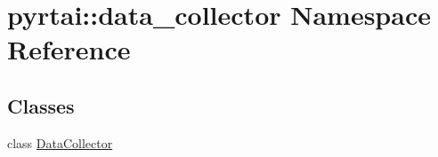 \hypertarget{namespacepyrtai_1_1data__collector}{
\section{pyrtai\-:\-:data\-\_\-collector \-Namespace \-Reference}
\label{namespacepyrtai_1_1data__collector}
}
\subsection*{\-Classes}
\begin{DoxyCompactItemize}
\item 
class \hyperlink{classpyrtai_1_1data__collector_1_1_data_collector}{\-Data\-Collector}
\end{DoxyCompactItemize}
